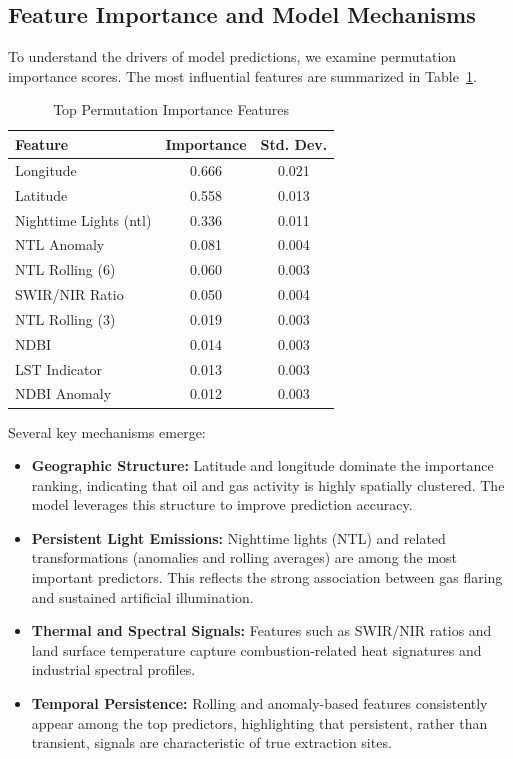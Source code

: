 \documentclass[12pt]{article}
\begin{document}
\subsection{Feature Importance and Model Mechanisms}

To understand the drivers of model predictions, we examine permutation importance scores. The most influential features are summarized in Table~\ref{tab:importance_ext}.

\begin{table}[H]
\centering
\caption{Top Permutation Importance Features}
\label{tab:importance_ext}
\begin{tabular}{lcc}
\toprule
Feature & Importance & Std. Dev. \\
\midrule
Longitude & 0.666 & 0.021 \\
Latitude  & 0.558 & 0.013 \\
Nighttime Lights (ntl) & 0.336 & 0.011 \\
NTL Anomaly & 0.081 & 0.004 \\
NTL Rolling (6) & 0.060 & 0.003 \\
SWIR/NIR Ratio & 0.050 & 0.004 \\
NTL Rolling (3) & 0.019 & 0.003 \\
NDBI & 0.014 & 0.003 \\
LST Indicator & 0.013 & 0.003 \\
NDBI Anomaly & 0.012 & 0.003 \\
\bottomrule
\end{tabular}
\end{table}

Several key mechanisms emerge:

\begin{itemize}
    \item \textbf{Geographic Structure:} Latitude and longitude dominate the importance ranking, indicating that oil and gas activity is highly spatially clustered. The model leverages this structure to improve prediction accuracy.
    
    \item \textbf{Persistent Light Emissions:} Nighttime lights (NTL) and related transformations (anomalies and rolling averages) are among the most important predictors. This reflects the strong association between gas flaring and sustained artificial illumination.
    
    \item \textbf{Thermal and Spectral Signals:} Features such as SWIR/NIR ratios and land surface temperature capture combustion-related heat signatures and industrial spectral profiles.
    
    \item \textbf{Temporal Persistence:} Rolling and anomaly-based features consistently appear among the top predictors, highlighting that persistent, rather than transient, signals are characteristic of true extraction sites.
\end{itemize}
\end{document}
